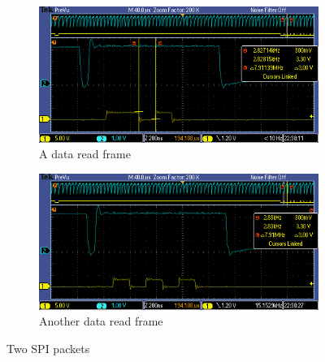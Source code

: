 \documentclass[12pt]{article}
\begin{document}
\begin{figure}[H]
  \centering
  \begin{subfigure}[b]{0.45\textwidth}
    \includegraphics[width=\textwidth]{./img/TEK00001}
    \caption{A data read frame}
    \label{fig:data-frame-0}
  \end{subfigure}
  \begin{subfigure}[b]{0.45\textwidth}
    \includegraphics[width=\textwidth]{./img/TEK00002}
    \caption{Another data read frame}
    \label{fig:data-frame-1}
  \end{subfigure}
  \caption{Two SPI packets}
  \label{fig:data-frames}
\end{figure}
\end{document}
